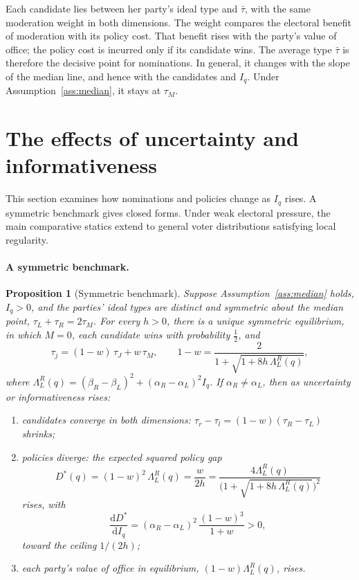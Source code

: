 \documentclass[12pt,letterpaper]{article}
\newtheorem{proposition}{Proposition}
\begin{document}
Each candidate lies between her party's ideal type and $\bar\tau$, with the same moderation weight in both dimensions. The weight compares the electoral benefit of moderation with its policy cost. That benefit rises with the party's value of office; the policy cost is incurred only if its candidate wins. The average type $\bar\tau$ is therefore the decisive point for nominations. In general, it changes with the slope of the median line, and hence with the candidates and $I_q$. Under Assumption~\ref{ass:median}, it stays at $\tau_M$.

\section{The effects of uncertainty and informativeness}\label{sec:effects}

This section examines how nominations and policies change as $I_q$ rises. A symmetric benchmark gives closed forms. Under weak electoral pressure, the main comparative statics extend to general voter distributions satisfying local regularity.

\paragraph{A symmetric benchmark.}

\begin{proposition}[Symmetric benchmark]\label{prop:symmetric}
Suppose Assumption~\ref{ass:median} holds, $I_q>0$, and the parties' ideal types are distinct and symmetric about the median point, $\tau_L+\tau_R=2\tau_M$. For every $h>0$, there is a unique symmetric equilibrium, in which $M=0$, each candidate wins with probability $\tfrac12$, and
\[
\tau_j=(1-w)\,\tau_J+w\,\tau_M,
\qquad
1-w=\frac{2}{1+\sqrt{1+8h\,\Lambda_L^R(q)}},
\]
where $\Lambda_L^R(q)=(\beta_R-\beta_L)^2+(\alpha_R-\alpha_L)^2I_q$. If $\alpha_R\ne\alpha_L$, then as uncertainty or informativeness rises:
\begin{enumerate}
  \item[(a)] candidates converge in both dimensions: $\tau_r-\tau_l=(1-w)(\tau_R-\tau_L)$ shrinks;
  \item[(b)] policies diverge: the expected squared policy gap
  \[
  D^*(q)=(1-w)^2\,\Lambda_L^R(q)=\frac{w}{2h}=\frac{4\Lambda_L^R(q)}{\big(1+\sqrt{1+8h\,\Lambda_L^R(q)}\big)^2}
  \]
  rises, with
  \[
  \frac{\mathrm{d}D^*}{\mathrm{d}I_q}=(\alpha_R-\alpha_L)^2\,\frac{(1-w)^3}{1+w}>0,
  \]
  toward the ceiling $1/(2h)$;
  \item[(c)] each party's value of office in equilibrium, $(1-w)\Lambda_L^R(q)$, rises.
\end{enumerate}
\end{proposition}
\end{document}
